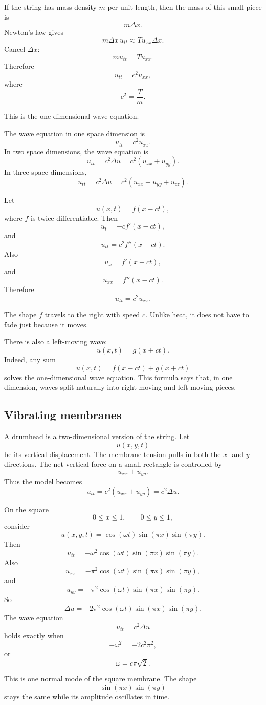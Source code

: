 If the string has mass density \(m\) per unit length, then the mass of this small piece is
\[
    m\Delta x.
\]
Newton's law gives
\[
    m\Delta x\,u_{tt}\approx T u_{xx}\Delta x.
\]
Cancel \(\Delta x\):
\[
    m u_{tt}=T u_{xx}.
\]
Therefore
\[
\boxed{
    u_{tt}=c^2u_{xx},
}
\]
where
\[
    c^2=\frac{T}{m}.
\]

This is the one-dimensional wave equation.

\begin{definition}
The wave equation in one space dimension is
\[
\boxed{
    u_{tt}=c^2u_{xx}.
}
\]
In two space dimensions, the wave equation is
\[
\boxed{
    u_{tt}=c^2\Delta u
    =
    c^2(u_{xx}+u_{yy}).
}
\]
In three space dimensions,
\[
\boxed{
    u_{tt}=c^2\Delta u
    =
    c^2(u_{xx}+u_{yy}+u_{zz}).
}
\]
\end{definition}

\begin{example}
Let
\[
    u(x,t)=f(x-ct),
\]
where \(f\) is twice differentiable.  Then
\[
    u_t=-c f'(x-ct),
\]
and
\[
    u_{tt}=c^2 f''(x-ct).
\]
Also
\[
    u_x=f'(x-ct),
\]
and
\[
    u_{xx}=f''(x-ct).
\]
Therefore
\[
    u_{tt}=c^2u_{xx}.
\]

The shape \(f\) travels to the right with speed \(c\).  Unlike heat, it does not have to
fade just because it moves.
\end{example}

There is also a left-moving wave:
\[
    u(x,t)=g(x+ct).
\]
Indeed, any sum
\[
\boxed{
    u(x,t)=f(x-ct)+g(x+ct)
}
\]
solves the one-dimensional wave equation.  This formula says that, in one dimension,
waves split naturally into right-moving and left-moving pieces.

\subsection{Vibrating membranes}

A drumhead is a two-dimensional version of the string.  Let
\[
    u(x,y,t)
\]
be its vertical displacement.  The membrane tension pulls in both the \(x\)- and
\(y\)-directions.  The net vertical force on a small rectangle is controlled by
\[
    u_{xx}+u_{yy}.
\]
Thus the model becomes
\[
\boxed{
    u_{tt}=c^2(u_{xx}+u_{yy})=c^2\Delta u.
}
\]

\begin{example}
On the square
\[
    0\le x\le1,\qquad 0\le y\le1,
\]
consider
\[
    u(x,y,t)=\cos(\omega t)\sin(\pi x)\sin(\pi y).
\]
Then
\[
    u_{tt}=-\omega^2\cos(\omega t)\sin(\pi x)\sin(\pi y).
\]
Also
\[
    u_{xx}=-\pi^2\cos(\omega t)\sin(\pi x)\sin(\pi y),
\]
and
\[
    u_{yy}=-\pi^2\cos(\omega t)\sin(\pi x)\sin(\pi y).
\]
So
\[
    \Delta u=-2\pi^2\cos(\omega t)\sin(\pi x)\sin(\pi y).
\]
The wave equation
\[
    u_{tt}=c^2\Delta u
\]
holds exactly when
\[
    -\omega^2=-2c^2\pi^2,
\]
or
\[
\boxed{
    \omega=c\pi\sqrt2.
}
\]

This is one normal mode of the square membrane.  The shape
\[
    \sin(\pi x)\sin(\pi y)
\]
stays the same while its amplitude oscillates in time.
\end{example}

